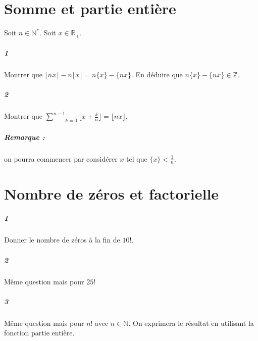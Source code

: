 \documentclass[10pt,a4paper]{article}
\begin{document}
\section{Somme et partie entière}
Soit $n \in \mathbb{N}^*$. Soit $x \in \mathbb{R}_+$.
\subparagraph{1}Montrer que $\lfloor nx \rfloor - n \lfloor x \rfloor = n \lbrace x \rbrace - \lbrace nx \rbrace$. En déduire que $n \lbrace x \rbrace - \lbrace nx \rbrace \in \mathbb{Z}$.
\subparagraph{2}Montrer que $\underset{k=0}{\overset{n-1}{\sum}} \lfloor x +\frac{k}{n}\rfloor= \lfloor nx \rfloor$.
\subparagraph{Remarque :} on pourra commencer par considérer $x$ tel que $\lbrace x \rbrace < \frac{1}{n}$.

\section{Nombre de zéros et factorielle}
\subparagraph{1}Donner le nombre de zéros à la fin de $10!$.
\subparagraph{2}Même question mais pour $25!$
\subparagraph{3}Même question mais pour $n!$ avec $n\in \mathbb{N}$. On exprimera le résultat en utilisant la fonction partie entière.
\end{document}

